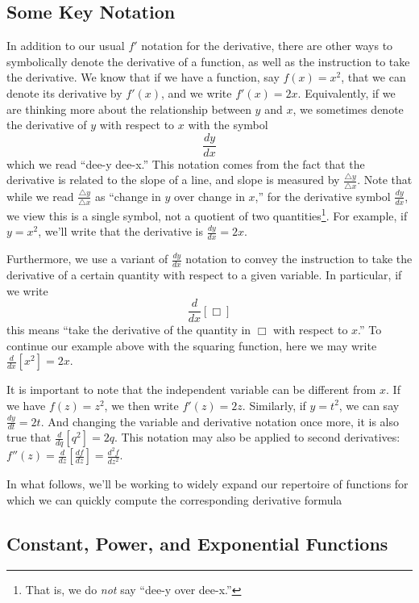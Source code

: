 

\subsection*{Some Key Notation}

In addition to our usual $f'$ notation for the derivative, there are other ways to symbolically denote the derivative of a function, as well as the instruction to take the derivative.  We know that if we have a function, say  $f(x) = x^2$, that we can denote its derivative by $f'(x)$, and we write $f'(x) = 2x$.  Equivalently, if we are thinking more about the relationship between $y$ and $x$, we sometimes denote the derivative of $y$ with respect to $x$ with the symbol 
$$\frac{dy}{dx}$$
which we read ``dee-y dee-x.''  This notation comes from the fact that the derivative is related to the slope of a line, and slope is measured by $\frac{\triangle y}{\triangle x}$.  Note that while we read $\frac{\triangle y}{\triangle x}$ as ``change in $y$ over change in $x$,'' for the derivative symbol $\frac{dy}{dx}$, we view this is a single symbol, not a quotient of two quantities\footnote{That is, we do \emph{not} say ``dee-y over dee-x.''}.  For example, if $y = x^2$, we'll write that the derivative is $\frac{dy}{dx} = 2x.$

Furthermore, we use a variant of $\frac{dy}{dx}$ notation to convey the instruction to take the derivative of a certain quantity with respect to a given variable.  In particular, if we write
$$\frac{d}{dx}\left[ \Box \right]$$
this means ``take the derivative of the quantity in $\Box$ with respect to $x$.''  To continue our example above with the squaring function, here we may write $\frac{d}{dx}[x^2] = 2x.$

It is important to note that the independent variable can be different from $x$.  If we have $f(z) = z^2$, we then write $f'(z) = 2z$.  Similarly, if $y = t^2$, we can say $\frac{dy}{dt} = 2t$.  And changing the variable and derivative notation once more, it is also true that $\frac{d}{dq}[q^2] = 2q$.  This notation may also be applied to second derivatives:  $f''(z) =  \frac{d}{dz}\left[\frac{df}{dz}\right] = \frac{d^2 f}{dz^2}$.

In what follows, we'll be working to widely expand our repertoire of functions for which we can quickly compute the corresponding derivative formula

\subsection*{Constant, Power, and Exponential Functions}

